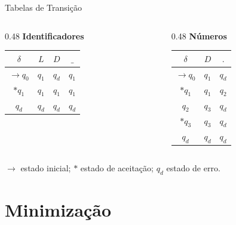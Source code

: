 \documentclass[aspectratio=169, 11pt]{beamer}
\begin{document}
\begin{frame}{Tabelas de Transição}

    \begin{columns}[T]
        \begin{column}{0.48\textwidth}
            \centering
            \textbf{Identificadores}

            \vspace{0.2cm}
            \begin{tabular}{c|ccc}
                $\delta$ & $L$ & $D$ & $\_$ \\
                \midrule
                $\to q_0$ & $q_1$ & $q_d$ & $q_1$ \\
                $*q_1$    & $q_1$ & $q_1$ & $q_1$ \\
                $q_d$     & $q_d$ & $q_d$ & $q_d$ \\
            \end{tabular}
        \end{column}

        \begin{column}{0.48\textwidth}
            \centering
            \textbf{Números}

            \vspace{0.2cm}
            \begin{tabular}{c|cc}
                $\delta$ & $D$ & $.$ \\
                \midrule
                $\to q_0$ & $q_1$ & $q_d$ \\
                $*q_1$    & $q_1$ & $q_2$ \\
                $q_2$     & $q_3$ & $q_d$ \\
                $*q_3$    & $q_3$ & $q_d$ \\
                $q_d$     & $q_d$ & $q_d$ \\
            \end{tabular}
        \end{column}
    \end{columns}

    \vspace{0.4cm}
    \begin{center}
        {\small $\to$ estado inicial; \quad $*$ estado de aceitação; \quad $q_d$ estado de erro.}
    \end{center}

\end{frame}

\section{Minimização}
\end{document}
